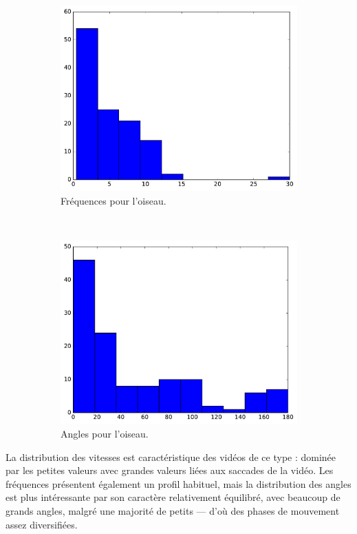 \begin{figure}
\begin{subfigure}[t]{\subImgWclicks}
			\includegraphics[width=\textwidth]{figures/ch3/oiseau_frequency}
			\caption{Fréquences pour l'oiseau.}
			\label{fig:oiseau_frequency}
		\end{subfigure}
		~
		\begin{subfigure}[t]{\subImgWclicks}
			\centering
			\includegraphics[width=\textwidth]{figures/ch3/oiseau_angle}
			\caption{Angles pour l'oiseau.}
			\label{fig:oiseau_angle}
		\end{subfigure}
		\caption[Histogrammes, navette spatiale et oiseau]{}
		\label{fig:histSpaceOiseau}
	\end{figure}
	
	La distribution des vitesses est caractéristique des vidéos de ce type : dominée par les petites valeurs avec grandes valeurs liées aux saccades de la vidéo. Les fréquences présentent également un profil habituel, mais la distribution des angles est plus intéressante par son caractère relativement équilibré, avec beaucoup de grands angles, malgré une majorité de petits --- d'où des phases de mouvement assez diversifiées.
	
